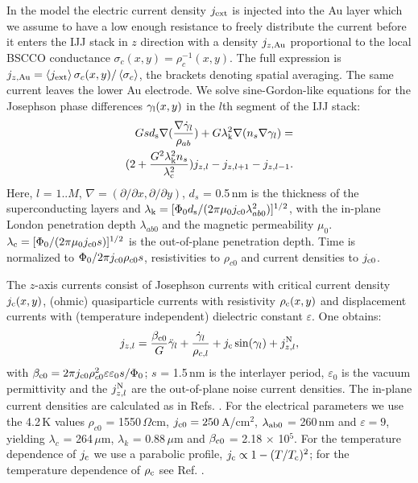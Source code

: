 \documentclass[aps,twocolumn,prb,showpacs,preprintnumbers,superscriptaddress,amsmath,amssymb,longbibliography]{revtex4-1}
\begin{document}
In the model the electric current density $j_{\rm{ext}}$ is injected into the Au layer which we assume to have a low enough resistance to freely distribute the current before it enters the IJJ stack in $z$ direction with a density $j_{z,\rm{Au}}$ proportional to the local BSCCO conductance $\sigma_{c} (x,y) = \rho_c^{-1}(x,y)$.
The full expression is $j_{z,\rm{Au}} = \left\langle j_{\rm{ext}}\right\rangle \sigma_{c}(x,y) / \left\langle\sigma_{c}\right\rangle$, the brackets denoting spatial averaging.
The same current leaves the lower Au electrode.
We solve sine-Gordon-like equations for the Josephson phase differences $\gamma_{\rm l}(x,y)$ in the $l$th segment of the IJJ stack: 
%
\begin{equation}
\label{eq:sigo_segment}
\begin{split}
Gsd_{\rm s}\nabla(\frac{\nabla\dot{\gamma}_l}{\rho_{ab}}) + G\lambda_{\rm k}^2 \nabla(n_s\nabla\gamma_l) = \\
(2+\frac{G^2\lambda_{\rm k}^2n_s}{\lambda_{\rm c}^2})j_{z,l}-j_{z,l+1}-j_{z,l-1}.
\end{split}
\end{equation}
%  
Here, $l$ = $1..M$, $\nabla = (\partial/\partial x, \partial/\partial y)$, $d_{s}$ =  0.5\,nm is the thickness of the superconducting layers and 
$\lambda_{\rm k} = [\Phi_0 d_{\rm s}/(2\pi\mu_0j_{\rm c0}\lambda_{ab0}^2)]^{1/2}$, with the in-plane London penetration depth $\lambda_{ab0}$  and the magnetic permeability $\mu_0$. $\lambda_{\rm c} = [\Phi_0/(2\pi\mu_0j_{\rm c0}s)]^{1/2}$  is the out-of-plane penetration depth. Time is normalized to $\Phi_0/2\pi j_{\rm c0}\rho_{c0}s$, resistivities to $\rho_{c0}$ and current densities to $j_{\rm c0}$. 


The $z$-axis currents consist of Josephson currents with critical current density $j_{{\rm c}}(x,y)$, (ohmic) quasiparticle currents with resistivity $\rho_{{\rm c}}(x,y)$ and displacement currents with (temperature independent) dielectric constant $\varepsilon$.
One obtains:
%
\begin{equation}
\label{eq:RCSJ}
j_{{z},l} = \frac{\beta_{\rm c0}}{G} \ddot{\gamma}_l + \frac{\dot{\gamma}_l}{\rho_{{c},l}} + j_{\rm c} \sin(\gamma_l) +j^{\rm N}_{{z},l},
\end{equation}
%
with $\beta_{\rm c0} = 2\pi j_{\rm c0}\rho_{c0}^2\varepsilon\varepsilon_0s/\Phi_0 $; $s$ = 1.5\,nm is the interlayer period, $\varepsilon_0$ is the vacuum permittivity and the $j^{\rm N}_{{z},l}$ are the out-of-plane noise current densities.  
The in-plane current densities are calculated as in Refs. .
For the electrical parameters we use the 4.2\,K values $\rho_{c0} $ = 1550\,$\Omega$cm, $j_{\rm c0} = 250$\,A/cm$^2$, $\lambda_{\rm ab0}$ = 260\,nm and $\varepsilon = 9$, yielding $\lambda_c$ =  264\,$\mu$m, $\lambda_k$ = 0.88\,$\mu$m and $\beta_{\rm c0}$ = 2.18 $\times$ 10$^5$. 
For the temperature dependence of $j_{\rm c}$ we use a parabolic profile, $j_{\rm c} \propto 1-(T/T_{\rm c})^2$; for the temperature dependence of $\rho_{\rm c}$ see Ref. .
\end{document}
